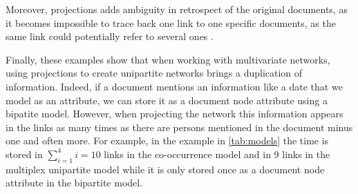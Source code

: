 Moreover, projections adds ambiguity in retrospect of the original documents, as it becomes impossible to trace back one link to one specific documents, as the same link could potentially refer to several ones \cite{cristofoliAuxSourcesGrands2008}.

Finally, these examples show that when working with multivariate networks, using projections to create unipartite networks brings a duplication of information.
Indeed, if a document mentions an information like a date that we model as an attribute, we can store it as a document node attribute using a bipatite model.
However, when projecting the network this information appears in the links as many times as there are persons mentioned in the document minus one and often more.
For example, in the example \pascal in \autoref{tab:models} the time is stored in $\sum_{i=1} ^{4} i = 10$ links in the co-occurrence model and in 9 links in the multiplex unipartite model while it is only stored once as a document node attribute in the bipartite model.

